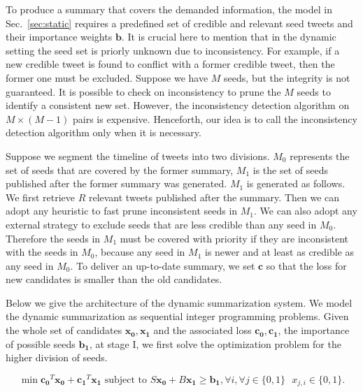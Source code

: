 \documentclass[envcountsame]{llncs}
\begin{document}
To produce a summary that covers the demanded information, the model in Sec.~\ref{sec:static} requires a predefined set of credible and relevant seed tweets and their importance weights $\mathbf{b}$. It is crucial here to mention that in the dynamic setting the seed set is priorly unknown due to inconsistency. For example, if a new credible tweet is found to conflict with a former credible tweet, then the former one must be excluded. Suppose we have $M$ seeds, but the integrity is not guaranteed. It is possible to check on inconsistency to prune the $M$ seeds to identify a consistent new set. However, the inconsistency detection algorithm on $M\times (M-1)$ pairs is expensive. Henceforth, our idea is to call the inconsistency detection algorithm only when it is necessary.

Suppose we segment the timeline of tweets into two divisions. $M_0$ represents the set of seeds that are covered by the former summary, $M_1$ is the set of seeds published after the former summary was generated. $M_1$ is generated as follows. We first retrieve $R$ relevant tweets published after the summary. Then we can adopt any heuristic to fast prune inconsistent seeds in $M_1$. We can also adopt any external strategy to exclude seeds that are less credible than any seed in $M_0$. Therefore the seeds in $M_1$ must be covered with priority if they are inconsistent with the seeds in $M_0$, because any seed in  $M_1$ is newer and at least as credible as any seed in $M_0$.  To deliver an up-to-date summary, we set $\mathbf{c}$ so that the loss for new candidates is smaller than the old candidates.

Below we give the architecture of the dynamic summarization system. We model the dynamic summarization as sequential integer programming problems.  Given the whole set of candidates $\mathbf{x_0,x_1}$ and the associated loss $\mathbf{c_0,c_1}$, the importance of possible seeds $\mathbf{b_1}$, at stage I, we first solve the optimization problem for the higher division of seeds.

\vspace{-0.6cm}
\begin{equation}\label{equ:stageI}
\min \mathbf{c_0}^T \mathbf{x_0} + \mathbf{c_1}^T \mathbf{x_1} \textrm{ subject to } S \mathbf{x_0} + B\mathbf{x_1} \geq \mathbf{b_1}, \forall i, \forall j\in \{0,1\}\textrm{ } x_{j,i}\in \{0,1\}.
\end{equation}
\vspace{-0.6cm}
\end{document}

